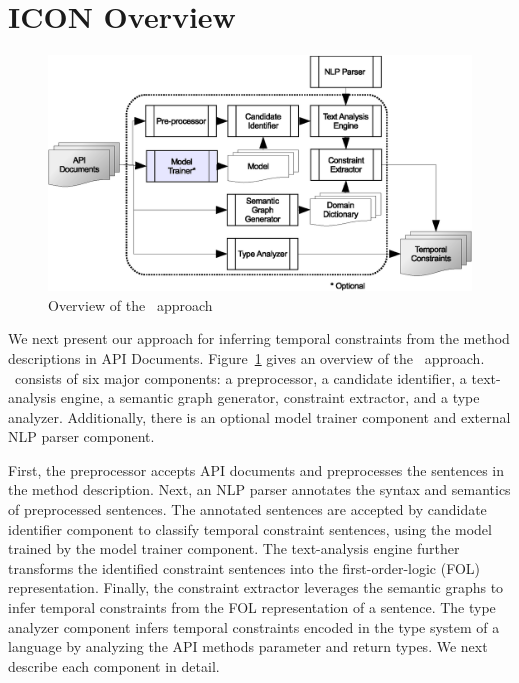 \section{ICON Overview}
\label{sec:approach}

\begin{figure}
	\centering
		\includegraphics[scale=0.45]{approach.eps}
	\vspace*{-2ex}
	\caption{Overview of the \tool\ approach}
	\label{fig:approachOverview}
	\vspace*{-4ex}
\end{figure}

We next present our approach for inferring temporal constraints
from the method descriptions in API Documents.
Figure~\ref{fig:approachOverview} gives an overview of the \tool\ approach.
\tool\ consists of six major components: a preprocessor, a candidate identifier, a text-analysis engine, a semantic graph generator, constraint extractor, and a type analyzer.
Additionally, there is an optional model trainer component and external NLP parser component.


First, the preprocessor accepts API documents and preprocesses the sentences in the method description.
Next, an NLP parser annotates the syntax and semantics of preprocessed sentences.
The annotated sentences are accepted by candidate identifier component to classify temporal constraint sentences,
using the model trained by the model trainer component.
The text-analysis engine further transforms the identified constraint sentences into the first-order-logic (FOL) representation.
Finally, the constraint extractor leverages the semantic graphs to infer temporal constraints from the FOL representation of a sentence.
The type analyzer component infers temporal constraints encoded in the type system of a language by analyzing the API methods parameter and return types.
We next describe each component in detail.


